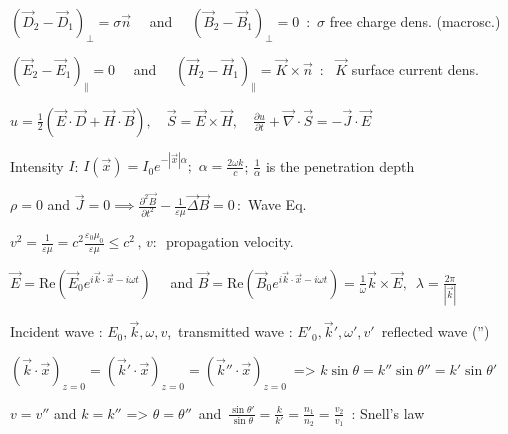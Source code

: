 \item $(\vec{D}_2 - \vec{D}_1)_{\perp} = \sigma \vec{n} \quad$ and  $\quad (\vec{B}_2 - \vec{B}_1)_{\perp} = 0 \,$ :\, $\sigma$ free charge dens. (macrosc.)

\item $(\vec{E}_2 - \vec{E}_1)_{\parallel} = 0 \quad $ and  $\quad (\vec{H}_2 - \vec{H}_1)_{\parallel} = \vec{K} \times \vec{n} \,$ : \, $\vec{K}$ surface current dens.
\squishend
{}
\squishlist

\item $u = \frac{1}{2}(\vec{E}\cdot\vec{D} + \vec{H}\cdot\vec{B}), \quad \vec{S} = \vec{E} \times \vec{H}, \quad \frac{\partial u}{\partial t} + \vec{\nabla}\cdot\vec{S} = - \vec{J}\cdot\vec{E}$

\item Intensity $I$: $I(\vec{x})=I_0e^{-|\vec{x}|\alpha}; $ $\alpha=\frac{2\omega k}{c}$; $ \frac{1}{\alpha}$ is the penetration depth
\squishend
{}
\squishlist
\item $\rho = 0$ and  $\vec{J} = 0  \implies  \frac{\partial^2 \vec{B}}{\partial t^2} - \frac{1}{\varepsilon \mu} \vec{\Delta}\vec{B}=0 \, :$  Wave Eq.

\item $v^2 = \frac{1}{\varepsilon\mu} = c^2 \frac{\varepsilon_0\mu_0}{\varepsilon \mu} \leq c^2 \, , \, v : \,$ propagation velocity. 

\item $\vec{E} = \text{Re}\left(\vec{E}_0 e^{i\vec{k}\cdot\vec{x} - i\omega t}\right) \quad $ and  $\vec{B} = \text{Re}\left(\vec{B}_0 e^{i\vec{k}\cdot\vec{x} - i\omega t}\right) = \frac{1}{\omega} \vec{k}\times\vec{E} , \, $  $\lambda = \frac{2\pi}{|\vec{k}|}$
\squishend

\squishlist
\item Incident wave : $E_0, \vec{k}, \omega, v$,\, transmitted wave : $E'_0, \vec{k}', \omega', v'$\, reflected wave ('')


\item $(\vec{k}\cdot\vec{x})_{z=0} = (\vec{k}'\cdot\vec{x})_{z=0} = (\vec{k}''\cdot\vec{x})_{z=0}\, $ => $k\sin\theta = k''\sin\theta'' = k'\sin\theta'$

\item $v = v''$ and $k =k''$ => $\theta = \theta'' \,$ and  $\, \frac{\sin\theta'}{\sin\theta} = \frac{k}{k'} = \frac{n_1}{n_2} = \frac{v_2}{v_1} \, $ : Snell's law\

